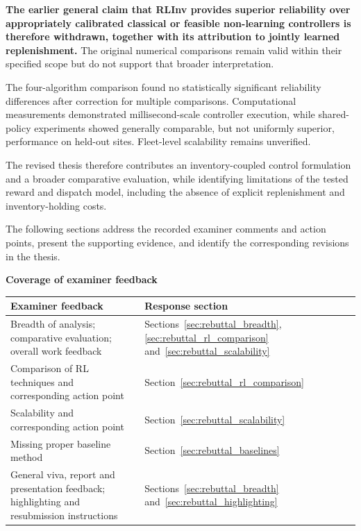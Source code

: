 \textbf{The earlier general claim that RLInv provides superior
reliability over appropriately calibrated classical or feasible
non-learning controllers is therefore withdrawn, together with its
attribution to jointly learned replenishment.}
The original numerical comparisons remain valid within
their specified scope but do not support that broader
interpretation.

The four-algorithm comparison found no statistically
significant reliability differences after correction
for multiple comparisons. Computational measurements
demonstrated millisecond-scale controller execution,
while shared-policy experiments showed generally
comparable, but not uniformly superior, performance
on held-out sites. Fleet-level scalability remains
unverified.

The revised thesis therefore contributes an
inventory-coupled control formulation and a broader
comparative evaluation, while identifying limitations
of the tested reward and dispatch model, including the
absence of explicit replenishment and inventory-holding
costs.

The following sections address the recorded examiner
comments and action points, present the supporting
evidence, and identify the corresponding revisions
in the thesis.


\vspace{0.5\baselineskip}

\noindent\textbf{Coverage of examiner feedback}

\begin{center}
\small
\begin{tabularx}{\textwidth}{
@{}>{\raggedright\arraybackslash}X
>{\raggedright\arraybackslash}p{}@{}}
\toprule
\textbf{Examiner feedback} & \textbf{Response section} \\
\midrule
Breadth of analysis; comparative evaluation;
overall work feedback
& Sections~\ref{sec:rebuttal_breadth},
\ref{sec:rebuttal_rl_comparison}
and~\ref{sec:rebuttal_scalability} \\

Comparison of RL techniques and corresponding
action point
& Section~\ref{sec:rebuttal_rl_comparison} \\

Scalability and corresponding action point
& Section~\ref{sec:rebuttal_scalability} \\

Missing proper baseline method
& Section~\ref{sec:rebuttal_baselines} \\

General viva, report and presentation feedback;
highlighting and resubmission instructions
& Sections~\ref{sec:rebuttal_breadth}
and~\ref{sec:rebuttal_highlighting} \\
\bottomrule
\end{tabularx}
\end{center}



